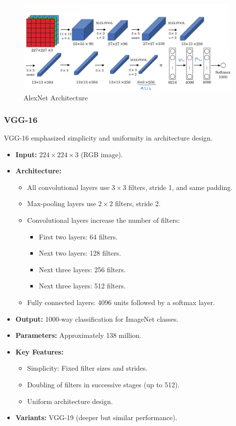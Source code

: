 \documentclass[letterpaper,12pt,notitlepage,twoside]{report}
\begin{document}
\begin{figure}[h]
	\centering
	\includegraphics[width=\textwidth]{Images/AlexNet.png}
	\caption{AlexNet Architecture}
	\label{fig:33}
\end{figure}

\subsubsection{VGG-16}
VGG-16 emphasized simplicity and uniformity in architecture design.
\begin{itemize}
    \item \textbf{Input:} $224 \times 224 \times 3$ (RGB image).
    \item \textbf{Architecture:}
    \begin{itemize}[nosep]
        \item All convolutional layers use $3 \times 3$ filters, stride 1, and same padding.
        \item Max-pooling layers use $2 \times 2$ filters, stride 2.
        \item Convolutional layers increase the number of filters:
        \begin{itemize}
            \item First two layers: 64 filters.
            \item Next two layers: 128 filters.
            \item Next three layers: 256 filters.
            \item Next three layers: 512 filters.
        \end{itemize}
        \item Fully connected layers: 4096 units followed by a softmax layer.
    \end{itemize}
    \item \textbf{Output:} 1000-way classification for ImageNet classes.
    \item \textbf{Parameters:} Approximately 138 million.
    \item \textbf{Key Features:}
    \begin{itemize}
        \item Simplicity: Fixed filter sizes and strides.
        \item Doubling of filters in successive stages (up to 512).
        \item Uniform architecture design.
    \end{itemize}
    \item \textbf{Variants:} VGG-19 (deeper but similar performance).
\end{itemize}
\end{document}
